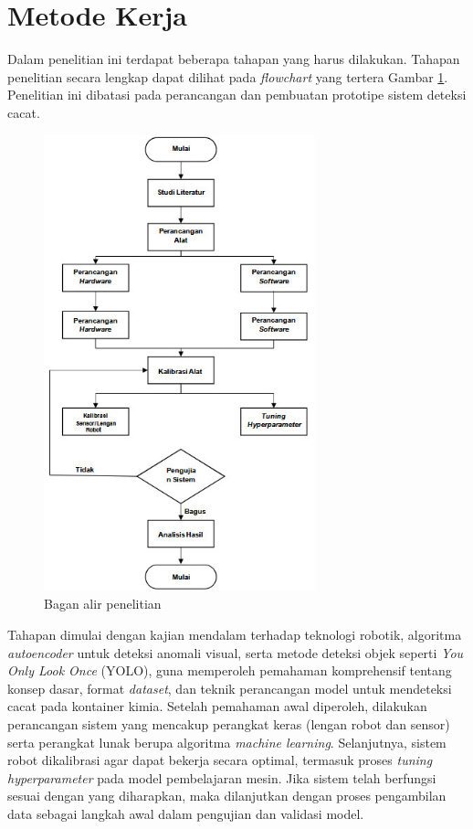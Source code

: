 \vspace{1em}

\section{Metode Kerja}
Dalam penelitian ini terdapat beberapa tahapan yang harus dilakukan.
Tahapan penelitian secara lengkap dapat dilihat pada
\textit{flowchart} yang tertera
Gambar \ref{fig:bagan-umum}. Penelitian ini dibatasi pada perancangan
dan pembuatan prototipe sistem deteksi cacat.
\begin{figure}[H]
  \centering
  \includegraphics[width=0.7\textwidth]{gambar/bagan-umum.jpg}
  \caption{Bagan alir penelitian}
  \label{fig:bagan-umum}
\end{figure}
\vspace{-1em}

Tahapan dimulai dengan kajian mendalam terhadap teknologi robotik,
algoritma \textit{autoencoder} untuk deteksi anomali visual, serta
metode deteksi objek seperti \textit{You Only Look Once} (YOLO), guna
memperoleh pemahaman komprehensif tentang konsep dasar, format
\textit{dataset}, dan teknik perancangan model untuk mendeteksi cacat
pada kontainer kimia. Setelah pemahaman awal diperoleh, dilakukan
perancangan sistem yang mencakup perangkat keras (lengan robot dan
sensor) serta perangkat lunak berupa algoritma \textit{machine
learning}. Selanjutnya, sistem robot dikalibrasi agar dapat bekerja
secara optimal, termasuk proses \textit{tuning hyperparameter} pada
model pembelajaran mesin. Jika sistem telah berfungsi sesuai dengan
yang diharapkan, maka dilanjutkan dengan proses pengambilan data
sebagai langkah awal dalam pengujian dan validasi model.

